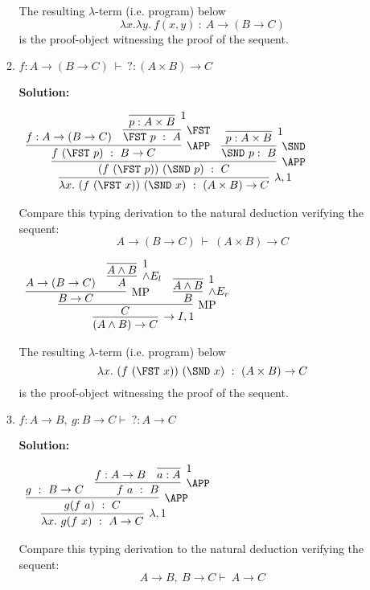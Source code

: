 \documentclass[11pt]{report}
\begin{document}
\begin{enumerate}
\begin{enumerate}
			The resulting $\lambda$-term (i.e. program) below
			$$ \lambda x. \lambda y. \ f(x,y) \ : \ A\to(B\to C)$$
			is the proof-object witnessing the proof of the sequent.

			\newpage
			\item $f : A \rightarrow (B \rightarrow  C) \ \vdash \ ? : ( A \times  B) \rightarrow  C$
			
			{\bf Solution:}
			\begin{mdframed}
				\begin{center}
					$\begin{array}{c}
						\infer[\lambda,1]{\lambda x. \ (f \ (\FST \ x)) \ (\SND \ x) \ : \ (A\times B)\to C}
							{\infer[\APP]{(f \ (\FST \ p)) \ (\SND \ p) \ : \ C}
								{\infer[\APP]{f \ (\FST \ p) \ : \ B\to C}
									{f : A \to (B \to C)
									&
									\infer[\FST]{\FST \ p \ : \ A}
										{\infer[1]{p : A\times B}
											{}}}
								&
								\infer[\SND]{\SND \ p : \ B}
									{\infer[1]{p : A\times B}
										{}}}}
					\end{array}$
				\end{center}				
			\end{mdframed}
			Compare this typing derivation to the natural deduction verifying the sequent: 
			$$A \rightarrow (B \rightarrow  C) \ \vdash \ (A \times  B) \rightarrow  C $$

			\begin{mdframed}
				\begin{center}
					$\begin{array}{c}
						\infer[\to I,1]{(A\land B)\to C}
							{\infer[\MP]{C}
								{\infer[\MP]{B\to C}
									{A \to (B \to C)
									&
									\infer[\land E_{l}]{A}
										{\infer[1]{A\land B}
											{}}}
								&
								\infer[\land E_{r}]{B}
									{\infer[1]{A\land B}
										{}}}}
					\end{array}$
				\end{center}				
			\end{mdframed}
			The resulting $\lambda$-term (i.e. program) below
			$$ \lambda x. \ (f \ (\FST \ x)) \ (\SND \ x) \ : \ (A\times B)\to C$$
			is the proof-object witnessing the proof of the sequent.

			\newpage			
			\item $f : A \rightarrow  B, \  g : B \rightarrow  C \vdash \ ? : A \rightarrow  C $
			
			{\bf Solution:}
			\begin{mdframed}
				\begin{center}
					$\begin{array}{c}
						\infer[\lambda,1]{\lambda x. \ g(f \ x) \ : \ A \to C}
							{\infer[\APP]{g(f \ a) \ : \ C}
								{g \ : \ B \to C
								&
								\infer[\APP]{f \ a \ : \ B}
									{f : A \to B
									&
									\infer[1]{a : A}{}}}}
					\end{array}$
				\end{center}
			\end{mdframed}
			Compare this typing derivation to the natural deduction verifying the sequent: 
			$$A \rightarrow  B, \ B \rightarrow  C \vdash \ A \rightarrow  C $$


\end{enumerate}
\end{enumerate}
\end{document}
